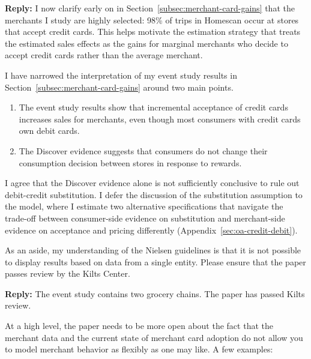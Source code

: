 \documentclass[main.tex]{subfiles}
\begin{document}
\begin{refsection}
\textbf{Reply:} I now clarify early on in Section~\ref{subsec:merchant-card-gains} that
the merchants I study are highly selected: 98\% of trips in Homescan occur at stores that accept credit cards.
This helps motivate the estimation strategy that treats the estimated sales effects as the gains for marginal merchants who decide to accept credit cards rather than the average merchant.

I have narrowed the interpretation of my event study results in Section~\ref{subsec:merchant-card-gains} around two main points.
\begin{enumerate}
  \item The event study results show that incremental acceptance of credit cards increases sales for merchants, even though most consumers with credit cards own debit cards.
  \item The Discover evidence suggests that consumers do not change their consumption decision between stores in response to rewards.
\end{enumerate}

I agree that the Discover evidence alone is not sufficiently conclusive to rule out debit-credit substitution.
I defer the discussion of the substitution assumption to the model, where I estimate two alternative specifications that navigate the trade-off between consumer-side evidence on substitution and merchant-side evidence on acceptance and pricing differently (Appendix~\ref{sec:oa-credit-debit}).

\begin{refcommentnoclear}
As an aside, my understanding of the Nielsen guidelines is that it is not possible to display results based on data from a single entity.
Please ensure that the paper passes review by the Kilts Center.
\end{refcommentnoclear}

\textbf{Reply:} The event study contains two grocery chains. The paper has passed Kilts review.

\begin{refcommentnoclear}
At a high level, the paper needs to be more open about the fact that the merchant data and the current state of merchant card adoption do not allow you to model merchant behavior as flexibly as one may like.
A few examples:


\end{refcommentnoclear}
\end{refsection}
\end{document}
